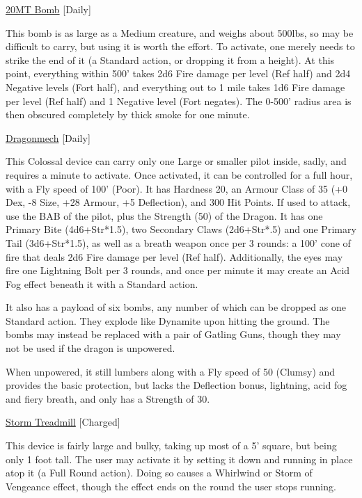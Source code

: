 \medskip\noindent\underline{20MT Bomb} [Daily]

\noindent This bomb is as large as a Medium creature, and weighs about 500lbs, so may be difficult to carry, but using it is worth the effort. To activate, one merely needs to strike the end of it (a Standard action, or dropping it from a height). At this point, everything within 500' takes 2d6 Fire damage per level (Ref half) and 2d4 Negative levels (Fort half), and everything out to 1 mile takes 1d6 Fire damage per level (Ref half) and 1 Negative level (Fort negates). The 0-500' radius area is then obscured completely by thick smoke for one minute.

\medskip\noindent\underline{Dragonmech} [Daily]

\noindent This Colossal device can carry only one Large or smaller pilot inside, sadly, and requires a minute to activate. Once activated, it can be controlled for a full hour, with a Fly speed of 100' (Poor). It has Hardness 20, an Armour Class of 35 (+0 Dex, -8 Size, +28 Armour, +5 Deflection), and 300 Hit Points. If used to attack, use the BAB of the pilot, plus the Strength (50) of the Dragon. It has one Primary Bite (4d6+Str*1.5), two Secondary Claws (2d6+Str*.5) and one Primary Tail (3d6+Str*1.5), as well as a breath weapon once per 3 rounds: a 100' cone of fire that deals 2d6 Fire damage per level (Ref half). Additionally, the eyes may fire one Lightning Bolt per 3 rounds, and once per minute it may create an Acid Fog effect beneath it with a Standard action.

\smallskip\noindent It also has a payload of six bombs, any number of which can be dropped as one Standard action. They explode like Dynamite upon hitting the ground. The bombs may instead be replaced with a pair of Gatling Guns, though they may not be used if the dragon is unpowered.

\smallskip\noindent When unpowered, it still lumbers along with a Fly speed of 50 (Clumsy) and provides the basic protection, but lacks the Deflection bonus, lightning, acid fog and fiery breath, and only has a Strength of 30.

\medskip\noindent\underline{Storm Treadmill} [Charged]

\noindent This device is fairly large and bulky, taking up most of a 5' square, but being only 1 foot tall. The user may activate it by setting it down and running in place atop it (a Full Round action). Doing so causes a Whirlwind or Storm of Vengeance effect, though the effect ends on the round the user stops running.

